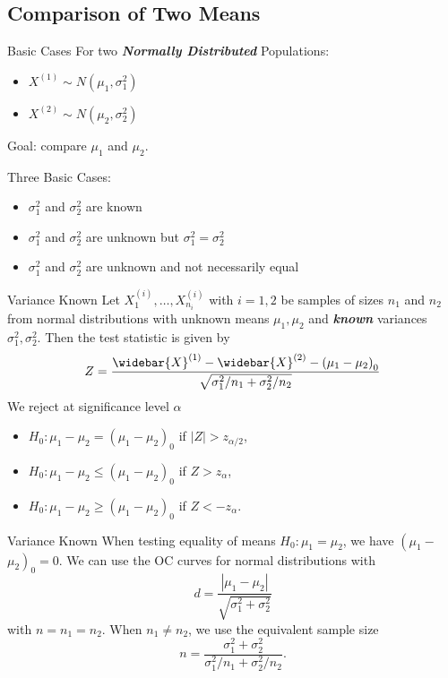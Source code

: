 \documentclass{beamer}
\newcommand{\bb}[1]{\textcolor{antiquefuchsia}{\textbf{\textit{#1}}}}
\begin{document}
\subsection{Comparison of Two Means}
\begin{frame}{Basic Cases}
For two \bb{Normally Distributed} Populations:
\begin{itemize}
\item $X^{(1)} \sim N\left(\mu_{1}, \sigma_{1}^{2}\right)$
\item $X^{(2)} \sim N\left(\mu_{2}, \sigma_{2}^{2}\right)$
\end{itemize}
Goal: compare $\mu_{1}$ and $\mu_{2}$.

Three Basic Cases:
\begin{itemize}
\item $\sigma_{1}^{2}$ and $\sigma_{2}^{2}$ are known
\item $\sigma_{1}^{2}$ and $\sigma_{2}^{2}$ are unknown but $\sigma_{1}^{2}=\sigma_{2}^{2}$
\item $\sigma_{1}^{2}$ and $\sigma_{2}^{2}$ are unknown and not necessarily equal
\end{itemize}
\end{frame}

\begin{frame}{Variance Known}
Let $X_{1}^{(i)}, \ldots, X_{n_{i}}^{(i)}$ with $i=1,2$ be samples of sizes $n_{1}$ and $n_{2}$ from normal distributions with unknown means $\mu_{1}, \mu_{2}$ and \bb{known} variances $\sigma_{1}^{2}, \sigma_{2}^{2}$. Then the test statistic is given by
$$
Z=\frac{\widebar{X}^{(1)}-\widebar{X}^{(2)}-\left(\mu_{1}-\mu_{2}\right)_{0}}{\sqrt{\sigma_{1}^{2} / n_{1}+\sigma_{2}^{2} / n_{2}}}
$$
We reject at significance level $\alpha$
\begin{itemize}
\item $H_{0}: \mu_{1}-\mu_{2}=\left(\mu_{1}-\mu_{2}\right)_{0}$ if $|Z|>z_{\alpha / 2}$,
\item $H_{0}: \mu_{1}-\mu_{2} \leq\left(\mu_{1}-\mu_{2}\right)_{0}$ if $Z>z_{\alpha}$,
\item $H_{0}: \mu_{1}-\mu_{2} \geq\left(\mu_{1}-\mu_{2}\right)_{0}$ if $Z<-z_{\alpha}$.
\end{itemize}
\end{frame}

\begin{frame}{Variance Known}
When testing equality of means $H_{0}: \mu_{1}=\mu_{2}$, we have $\left(\mu_{1}-\right.$ $\left.\mu_{2}\right)_{0}=0$. We can use the OC curves for normal distributions with
$$
d=\frac{\left|\mu_{1}-\mu_{2}\right|}{\sqrt{\sigma_{1}^{2}+\sigma_{2}^{2}}}
$$
with $n=n_{1}=n_{2}$. When $n_{1} \neq n_{2}$, we use the equivalent sample size
$$
n=\frac{\sigma_{1}^{2}+\sigma_{2}^{2}}{\sigma_{1}^{2} / n_{1}+\sigma_{2}^{2} / n_{2}} .
$$
\end{frame}
\end{document}
